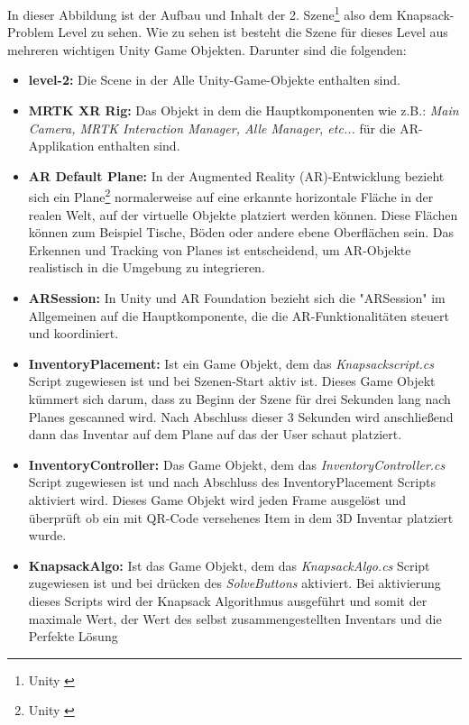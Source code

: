 In dieser Abbildung ist der Aufbau und Inhalt der 2. Szene\footnote{Unity \cite{Scene}} also dem Knapsack-Problem Level
zu sehen. Wie zu sehen ist besteht die Szene für dieses Level aus mehreren wichtigen Unity Game Objekten. Darunter
sind die folgenden:

\begin{itemize}
    \item \textbf{level-2:} Die Scene in der Alle Unity-Game-Objekte enthalten sind.
    \item \textbf{MRTK XR Rig:} Das Objekt in dem die Hauptkomponenten wie z.B.: \textit{Main Camera, MRTK Interaction
    Manager, Alle Manager, etc... } für die AR-Applikation enthalten sind.
    \item \textbf{AR Default Plane:} In der Augmented Reality (AR)-Entwicklung bezieht sich ein Plane\footnote{Unity \cite{Plane}} normalerweise
    auf eine erkannte horizontale Fläche in der realen Welt, auf der virtuelle Objekte platziert werden können. Diese
    Flächen können zum Beispiel Tische, Böden oder andere ebene Oberflächen sein. Das Erkennen und Tracking von Planes
    ist entscheidend, um AR-Objekte realistisch in die Umgebung zu integrieren.
    \item \textbf{ARSession:} In Unity und AR Foundation bezieht sich die "ARSession" im Allgemeinen auf die
    Hauptkomponente, die die AR-Funktionalitäten steuert und koordiniert.
    \item \textbf{InventoryPlacement:} Ist ein Game Objekt, dem das \textit{Knapsackscript.cs} Script zugewiesen ist und
    bei Szenen-Start aktiv ist. Dieses Game Objekt kümmert sich darum, dass zu Beginn der Szene für drei Sekunden lang
    nach Planes gescanned wird. Nach Abschluss dieser 3 Sekunden wird anschließend dann das Inventar auf dem Plane auf
    das der User schaut platziert.
    \item \textbf{InventoryController:} Das Game Objekt, dem das \textit{InventoryController.cs} Script zugewiesen ist
    und nach Abschluss des InventoryPlacement Scripts aktiviert wird. Dieses Game Objekt wird jeden Frame ausgelöst
    und überprüft ob ein mit QR-Code versehenes Item in dem 3D Inventar platziert wurde.
    \item \textbf{KnapsackAlgo:} Ist das Game Objekt, dem das \textit{KnapsackAlgo.cs} Script zugewiesen ist und bei
    drücken des \textit{SolveButtons} aktiviert. Bei aktivierung dieses Scripts wird der Knapsack Algorithmus
    ausgeführt und somit der maximale Wert, der Wert des selbst zusammengestellten Inventars und die Perfekte Lösung

\end{itemize}
